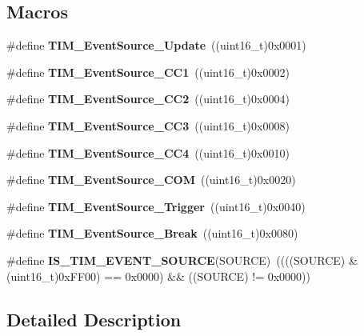 \subsection*{Macros}
\begin{DoxyCompactItemize}
\item 
\mbox{\label{group___t_i_m___event___source_ga5bff72fbe94b1ae5a710e402c9868b23}} 
\#define {\bfseries T\+I\+M\+\_\+\+Event\+Source\+\_\+\+Update}~((uint16\+\_\+t)0x0001)
\item 
\mbox{\label{group___t_i_m___event___source_gaa634c46d4ac521ad16e25be97b487e8a}} 
\#define {\bfseries T\+I\+M\+\_\+\+Event\+Source\+\_\+\+C\+C1}~((uint16\+\_\+t)0x0002)
\item 
\mbox{\label{group___t_i_m___event___source_ga5e2082a09552acc9c7e9577f104ba15a}} 
\#define {\bfseries T\+I\+M\+\_\+\+Event\+Source\+\_\+\+C\+C2}~((uint16\+\_\+t)0x0004)
\item 
\mbox{\label{group___t_i_m___event___source_gafeb8538e3b00d938e061e5051f83836b}} 
\#define {\bfseries T\+I\+M\+\_\+\+Event\+Source\+\_\+\+C\+C3}~((uint16\+\_\+t)0x0008)
\item 
\mbox{\label{group___t_i_m___event___source_gab60e3190e6c09d2d067f2c689d614979}} 
\#define {\bfseries T\+I\+M\+\_\+\+Event\+Source\+\_\+\+C\+C4}~((uint16\+\_\+t)0x0010)
\item 
\mbox{\label{group___t_i_m___event___source_ga4c06981037fae91786f966aa9b4b3435}} 
\#define {\bfseries T\+I\+M\+\_\+\+Event\+Source\+\_\+\+C\+OM}~((uint16\+\_\+t)0x0020)
\item 
\mbox{\label{group___t_i_m___event___source_ga24835bf5eac25eed90069208dce22564}} 
\#define {\bfseries T\+I\+M\+\_\+\+Event\+Source\+\_\+\+Trigger}~((uint16\+\_\+t)0x0040)
\item 
\mbox{\label{group___t_i_m___event___source_gad6f9b5366d93c73ff005273c50c9f00a}} 
\#define {\bfseries T\+I\+M\+\_\+\+Event\+Source\+\_\+\+Break}~((uint16\+\_\+t)0x0080)
\item 
\mbox{\label{group___t_i_m___event___source_ga4ac88c3e43c8250114ea81a6e052d58a}} 
\#define {\bfseries I\+S\+\_\+\+T\+I\+M\+\_\+\+E\+V\+E\+N\+T\+\_\+\+S\+O\+U\+R\+CE}(S\+O\+U\+R\+CE)~((((S\+O\+U\+R\+CE) \& (uint16\+\_\+t)0x\+F\+F00) == 0x0000) \&\& ((\+S\+O\+U\+R\+C\+E) != 0x0000))
\end{DoxyCompactItemize}


\subsection{Detailed Description}
